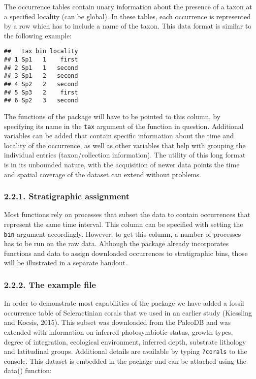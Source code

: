 \documentclass[]{article}
\begin{document}
The occurrence tables contain unary information about the presence of a
taxon at a specified locality (can be global). In these tables, each
occurrence is represented by a row which has to include a name of the
taxon. This data format is similar to the following example:

\begin{verbatim}
##   tax bin locality
## 1 Sp1   1    first
## 2 Sp1   1   second
## 3 Sp1   2   second
## 4 Sp2   2   second
## 5 Sp3   2    first
## 6 Sp2   3   second
\end{verbatim}

The functions of the package will have to be pointed to this column, by
specifying its name in the \texttt{tax} argument of the function in
question. Additional variables can be added that contain specific
information about the time and locality of the occurrence, as well as
other variables that help with grouping the individual entries
(taxon/collection information). The utility of this long format is in
its unbounded nature, with the acquisition of newer data points the time
and spatial coverage of the dataset can extend without problems.

\subsubsection{2.2.1. Stratigraphic
assignment}\label{stratigraphic-assignment}

Most functions rely on processes that subset the data to contain
occurrences that represent the same time interval. This column can be
specified with setting the \texttt{bin} argument accordingly. However,
to get this column, a number of processes has to be run on the raw data.
Although the package already incorporates functions and data to assign
downloaded occurrences to stratigraphic bins, those will be illustrated
in a separate handout.

\subsubsection{2.2.2. The example file}\label{the-example-file}

In order to demonstrate most capabilities of the package we have added a
fossil occurrence table of Scleractinian corals that we used in an
earlier study (Kiessling and Kocsis, 2015). This subset was downloaded
from the PaleoDB and was extended with information on inferred
photosymbiotic status, growth types, degree of integration, ecological
environment, inferred depth, substrate lithology and latitudinal groups.
Additional details are available by typing \texttt{?corals} to the
console. This dataset is embedded in the package and can be attached
using the data() function:
\end{document}
